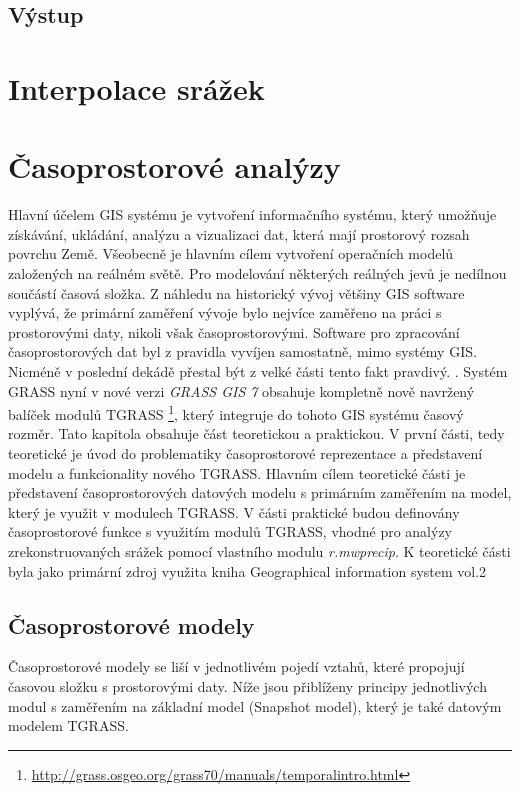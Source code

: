 \documentclass[a4paper,12pt]{article}
\begin{document}
\subsection{Výstup}


\setcounter{footnote}{1}
\section{Interpolace srážek}


\setcounter{footnote}{1}
\section{Časoprostorové analýzy}
Hlavní účelem GIS systému je  vytvoření informačního systému, který umožňuje získávání, ukládání, analýzu a vizualizaci dat, která mají prostorový rozsah povrchu Země. Všeobecně je hlavním cílem vytvoření operačních modelů založených na reálném světě. Pro modelování některých reálných jevů je nedílnou součástí časová složka. Z náhledu na historický vývoj většiny GIS software vyplývá, že primární zaměření vývoje bylo nejvíce zaměřeno na práci s prostorovými daty, nikoli však časoprostorovými. Software pro zpracování  časoprostorových dat byl z pravidla vyvíjen samostatně, mimo systémy GIS. Nicméně v poslední dekádě přestal být z velké části tento fakt pravdivý. .\cite{geospatialanal} Systém GRASS nyní v nové verzi \textit{GRASS GIS 7 } obsahuje kompletně nově navržený balíček modulů TGRASS \footnote{\url{http://grass.osgeo.org/grass70/manuals/temporalintro.html}}, který integruje do tohoto GIS systému časový rozměr.
Tato kapitola obsahuje část teoretickou a praktickou. V první části, tedy teoretické je úvod do problematiky časoprostorové reprezentace a představení modelu a funkcionality nového TGRASS. Hlavním cílem teoretické části je představení časoprostorových datových modelu s primárním zaměřením na model, který je využit v modulech TGRASS. V části praktické budou definovány časoprostorové funkce s využitím modulů TGRASS, vhodné  pro analýzy zrekonstruovaných srážek pomocí vlastního modulu \textit{r.mwprecip}. K teoretické části byla jako primární zdroj využita kniha Geographical information system vol.2\cite{gistemporal}

\subsection{Časoprostorové modely}

Časoprostorové modely se liší v jednotlivém pojedí vztahů, které propojují časovou složku s prostorovými daty. Níže jsou přiblíženy principy jednotlivých modul s zaměřením na základní model (Snapshot model), který je také datovým modelem TGRASS.
\end{document}
